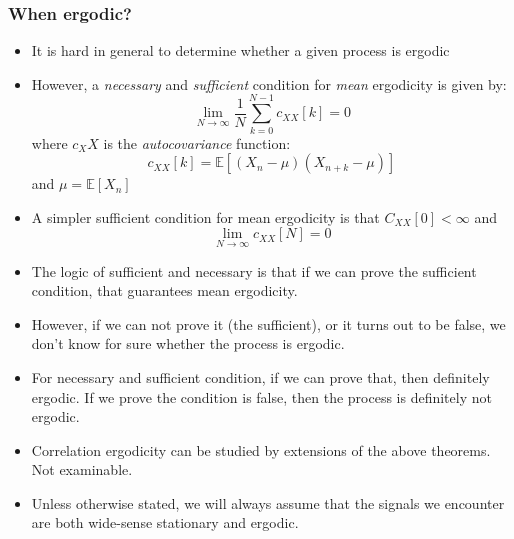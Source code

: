\documentclass[12pt]{article}
\newcommand{\titc}[1]{\textit{\textcolor{blue1}{#1}}}
\newcommand{\mexp}{\mathbb{E}}
\begin{document}
\subsubsection{When ergodic?}
\begin{itemize}
    \item It is hard in general to determine whether a given process is ergodic
    \item However, a \textit{necessary} and \textit{sufficient} condition for \titc{mean} ergodicity is given by:
    \[
    \lim_{N\rightarrow\infty} \frac{1}{N} \sum_{k=0}^{N-1}c_{XX}[k] = 0
    \]
    where $c_XX$ is the \titc{autocovariance} function:
    \[
    c_{XX}[k] = \mexp[(X_{n}-\mu)(X_{n+k}-\mu)]
    \]
    and $\mu=\mexp[X_n]$
    \item A simpler sufficient condition for mean ergodicity is that $C_{XX}[0] < \infty$ and 
    \[
    \lim_{N\rightarrow \infty} c_{XX}[N] = 0
    \]
    \item The logic of sufficient and necessary is that if we can prove the sufficient condition, that guarantees mean ergodicity.
    \item However, if we can not prove it (the sufficient), or it turns out to be false, we don't know for sure whether the process is ergodic. 
    \item For necessary and sufficient condition, if we can prove that, then definitely ergodic. If we prove the condition is false, then the process is definitely not ergodic.
    \item Correlation ergodicity can be studied by extensions of the above theorems. Not examinable.
    \item Unless otherwise stated, we will always assume that the signals we encounter are both wide-sense stationary and ergodic.
\end{itemize}
\end{document}
